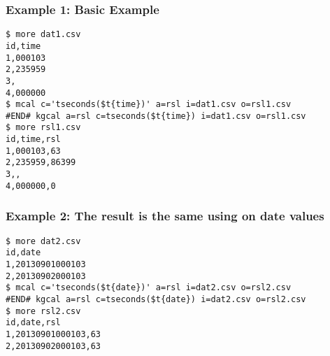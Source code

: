 \subsubsection*{Example 1: Basic Example}



\begin{Verbatim}[baselinestretch=0.7,frame=single]
$ more dat1.csv
id,time
1,000103
2,235959
3,
4,000000
$ mcal c='tseconds($t{time})' a=rsl i=dat1.csv o=rsl1.csv
#END# kgcal a=rsl c=tseconds($t{time}) i=dat1.csv o=rsl1.csv
$ more rsl1.csv
id,time,rsl
1,000103,63
2,235959,86399
3,,
4,000000,0
\end{Verbatim}
\subsubsection*{Example 2: The result is the same using on date values}



\begin{Verbatim}[baselinestretch=0.7,frame=single]
$ more dat2.csv
id,date
1,20130901000103
2,20130902000103
$ mcal c='tseconds($t{date})' a=rsl i=dat2.csv o=rsl2.csv
#END# kgcal a=rsl c=tseconds($t{date}) i=dat2.csv o=rsl2.csv
$ more rsl2.csv
id,date,rsl
1,20130901000103,63
2,20130902000103,63
\end{Verbatim}
